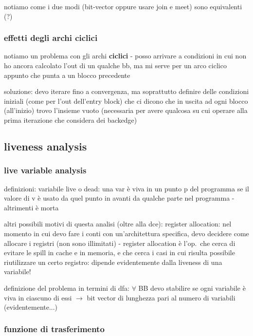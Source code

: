 notiamo come i due modi (bit-vector oppure usare join e meet) sono equivalenti (?)

\subsubsection{effetti degli archi ciclici}

notiamo un problema con gli archi \textbf{ciclici} - posso arrivare a condizioni in cui non ho ancora calcolato l'out di un qualche bb, ma mi serve per un arco ciclico appunto che punta a un blocco precedente

soluzione: devo iterare fino a convergenza, ma soprattutto definire delle condizioni iniziali (come per l'out dell'entry block) che ci dicono che in uscita ad ogni blocco (all'inizio) trovo l'insieme vuoto (necessaria per avere qualcosa su cui operare alla prima iterazione che considera dei backedge)

\subsection{liveness analysis}

\subsubsection{live variable analysis}

definizioni: variabile live o dead: una var \`e viva in un punto p del programma se il valore di v \`e usato da quel punto in avanti da qualche parte nel programma - altrimenti \`e morta

altri possibili motivi di questa analisi (oltre alla dce): register allocation: nel momento in cui devo fare i conti con un'architettura specifica, devo decidere come allocare i registri (non sono illimitati) - register allocation \`e l'op.~che cerca di evitare le spill in cache e in memoria, e che cerca i casi in cui risulta possibile riutilizzare un certo registro: dipende evidentemente dalla liveness di una variabile!

definizione del problema in termini di dfa: $\forall$ BB devo stabilire se ogni variabile \`e viva in ciascuno di essi $\rightarrow$ bit vector di lunghezza pari al numero di variabili (evidentemente...)

\subsubsection{funzione di trasferimento}

